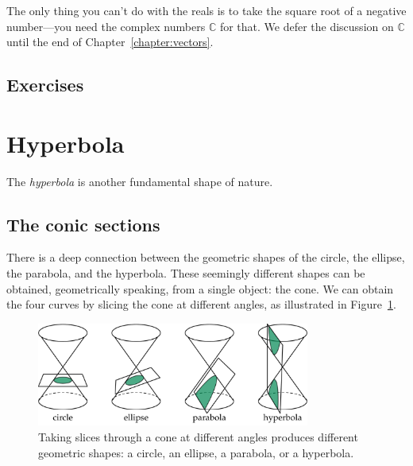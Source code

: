 		The only thing you can't do with the reals is to take the square root of a negative number---you 							
		need the complex numbers $\mathbb{C}$ for that.
		We defer the discussion on $\mathbb{C}$ until the end of Chapter~\ref{chapter:vectors}.


	\subsection{Exercises}
	\label{numbers:exercises}
	
		
	


\section{Hyperbola}
\label{sec:hyperbola}

	The \emph{hyperbola} is another fundamental shape of nature.
	

	\subsection{The conic sections}

		There is a deep connection between the geometric shapes of the circle,
		the ellipse, the parabola, and the hyperbola.
		These seemingly different shapes can be obtained, geometrically speaking,
		from a single object: the cone.															
		We can obtain the four curves by slicing the cone at different angles,
		as illustrated in Figure~\ref{fig:conic_sections_four-shapes}.

		\begin{figure}[htb]
			\centering
			\includegraphics[width=0.8\textwidth]{images/figures/math/conic_sections_four-shapes.png}
			\vspace{-2mm}
			\caption{	Taking slices through a cone at different angles produces different geometric shapes:
					a circle, an ellipse, a parabola, or a hyperbola.\label{fig:conic_sections_four-shapes}}
			
		\end{figure}
	


